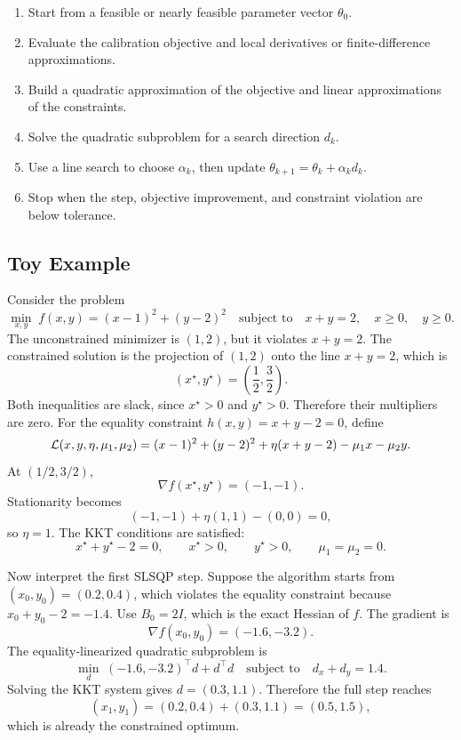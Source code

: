 \begin{tcolorbox}[title={Simplified SLSQP loop}, colback=white, boxrule=0.4pt]
\begin{enumerate}[leftmargin=8mm, itemsep=2pt]
    \item Start from a feasible or nearly feasible parameter vector \(\theta_0\).
    \item Evaluate the calibration objective and local derivatives or finite-difference approximations.
    \item Build a quadratic approximation of the objective and linear approximations of the constraints.
    \item Solve the quadratic subproblem for a search direction \(d_k\).
    \item Use a line search to choose \(\alpha_k\), then update \(\theta_{k+1}=\theta_k+\alpha_k d_k\).
    \item Stop when the step, objective improvement, and constraint violation are below tolerance.
\end{enumerate}
\end{tcolorbox}
\vspace{0.5cm}
\subsection{Toy Example}

Consider the problem
\begin{equation}
    \min_{x,y}\; f(x,y)=(x-1)^2+(y-2)^2
    \quad\text{subject to}\quad
    x+y=2,\quad x\geq0,\quad y\geq0.
\end{equation}
The unconstrained minimizer is \((1,2)\), but it violates \(x+y=2\). The constrained solution is the projection of \((1,2)\) onto the line \(x+y=2\), which is
\begin{equation}
    (x^\star,y^\star)=\left(\frac{1}{2},\frac{3}{2}\right).
\end{equation}
Both inequalities are slack, since \(x^\star>0\) and \(y^\star>0\). Therefore their multipliers are zero. For the equality constraint \(h(x,y)=x+y-2=0\), define
\[
    \mathcal{L}(x,y,\eta,\mu_1,\mu_2)
    =
    (x-1)^2+(y-2)^2
    +\eta(x+y-2)-\mu_1x-\mu_2y.
\]
At \((1/2,3/2)\),
\[
    \nabla f(x^\star,y^\star)=(-1,-1).
\]
Stationarity becomes
\[
    (-1,-1)+\eta(1,1)-(0,0)=0,
\]
so \(\eta=1\). The KKT conditions are satisfied:
\[
    x^\star+y^\star-2=0,\qquad x^\star>0,\qquad y^\star>0,\qquad
    \mu_1=\mu_2=0.
\]

Now interpret the first SLSQP step. Suppose the algorithm starts from \((x_0,y_0)=(0.2,0.4)\), which violates the equality constraint because \(x_0+y_0-2=-1.4\). Use \(B_0=2I\), which is the exact Hessian of \(f\). The gradient is
\[
    \nabla f(x_0,y_0)=(-1.6,-3.2).
\]
The equality-linearized quadratic subproblem is
\[
    \min_d\; (-1.6,-3.2)^\top d+d^\top d
    \quad\text{subject to}\quad d_x+d_y=1.4.
\]
Solving the KKT system gives \(d=(0.3,1.1)\). Therefore the full step reaches
\[
    (x_1,y_1)=(0.2,0.4)+(0.3,1.1)=(0.5,1.5),
\]
which is already the constrained optimum.



